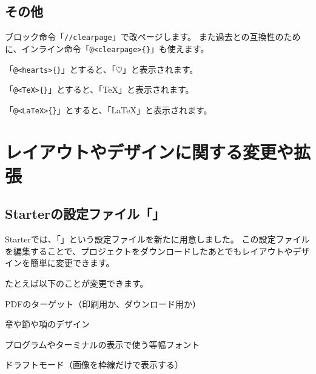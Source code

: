 \label{}
\begin{starterterminal}\end{starterterminal}

\subsection*{その他}
\label{sec:1-1-21}

\begin{starteritemize}
\item ブロック命令「\texttt{//clearpage}」で改ページします。
   また過去との互換性のために、インライン命令「\texttt{@\textless{}clearpage\textgreater{}\{\}}」も使えます。
\item 「\texttt{@\textless{}hearts\textgreater{}\{\}}」とすると、「$\heartsuit$」と表示されます。
\item 「\texttt{@\textless{}TeX\textgreater{}\{\}}」とすると、「\TeX{}」と表示されます。
\item 「\texttt{@\textless{}LaTeX\textgreater{}\{\}}」とすると、「\LaTeX{}」と表示されます。
\end{starteritemize}

\section{レイアウトやデザインに関する変更や拡張}
\label{sec:1-2}
\label{sec-design}

\subsection*{Starterの設定ファイル「」}
\label{sec:1-2-1}

Starterでは、「」という設定ファイルを新たに用意しました。
この設定ファイルを編集することで、プロジェクトをダウンロードしたあとでもレイアウトやデザインを簡単に変更できます。

たとえば以下のことが変更できます。

\begin{starteritemize}
\item PDFのターゲット（印刷用か、ダウンロード用か）
\item 章や節や項のデザイン
\item プログラムやターミナルの表示で使う等幅フォント
\item ドラフトモード（画像を枠線だけで表示する）
\end{starteritemize}

